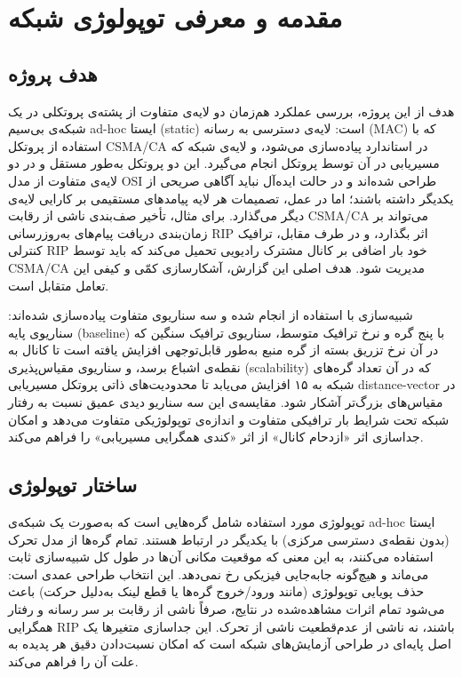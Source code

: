 \documentclass{article}
\begin{document}
	
	
	
	\newpage
	\tableofcontents
	\newpage
	
	\section{مقدمه و معرفی توپولوژی شبکه}
	
	\subsection{هدف پروژه}
	هدف از این پروژه، بررسی عملکرد هم‌زمان دو لایه‌ی متفاوت از پشته‌ی پروتکلی در یک شبکه‌ی بی‌سیم ad-hoc ایستا (static) است: لایه‌ی دسترسی به رسانه (MAC) که با استفاده از پروتکل CSMA/CA در استاندارد  پیاده‌سازی می‌شود، و لایه‌ی شبکه که مسیریابی در آن توسط پروتکل  انجام می‌گیرد. این دو پروتکل به‌طور مستقل و در دو لایه‌ی متفاوت از مدل OSI طراحی شده‌اند و در حالت ایده‌آل نباید آگاهی صریحی از یکدیگر داشته باشند؛ اما در عمل، تصمیمات هر لایه پیامدهای مستقیمی بر کارایی لایه‌ی دیگر می‌گذارد. برای مثال، تأخیر صف‌بندی ناشی از رقابت CSMA/CA می‌تواند بر زمان‌بندی دریافت پیام‌های به‌روزرسانی RIP اثر بگذارد، و در طرف مقابل، ترافیک کنترلی RIP خود بار اضافی بر کانال مشترک رادیویی تحمیل می‌کند که باید توسط CSMA/CA مدیریت شود. هدف اصلی این گزارش، آشکارسازی کمّی و کیفی این تعامل متقابل 
	 است.
	
	شبیه‌سازی با استفاده از  انجام شده و سه سناریوی متفاوت پیاده‌سازی شده‌اند: سناریوی پایه (baseline) با پنج گره و نرخ ترافیک متوسط، سناریوی ترافیک سنگین  که در آن نرخ تزریق بسته از گره منبع به‌طور قابل‌توجهی افزایش یافته است تا کانال به نقطه‌ی اشباع برسد، و سناریوی مقیاس‌پذیری (scalability) که در آن تعداد گره‌های شبکه به ۱۵ افزایش می‌یابد تا محدودیت‌های ذاتی پروتکل مسیریابی distance-vector در مقیاس‌های بزرگ‌تر آشکار شود. مقایسه‌ی این سه سناریو دیدی عمیق نسبت به رفتار شبکه تحت شرایط بار ترافیکی متفاوت و اندازه‌ی توپولوژیکی متفاوت می‌دهد و امکان جداسازی اثر «ازدحام کانال» از اثر «کندی همگرایی مسیریابی» را فراهم می‌کند.
	
	\subsection{ساختار توپولوژی}
	توپولوژی مورد استفاده شامل گره‌هایی است که به‌صورت یک شبکه‌ی ad-hoc ایستا (بدون نقطه‌ی دسترسی مرکزی) با یکدیگر در ارتباط هستند. تمام گره‌ها از مدل تحرک  استفاده می‌کنند، به این معنی که موقعیت مکانی آن‌ها در طول کل شبیه‌سازی ثابت می‌ماند و هیچ‌گونه جابه‌جایی فیزیکی رخ نمی‌دهد. این انتخاب طراحی عمدی است: حذف پویایی توپولوژی (مانند ورود/خروج گره‌ها یا قطع لینک به‌دلیل حرکت) باعث می‌شود تمام اثرات مشاهده‌شده در نتایج، صرفاً ناشی از رقابت بر سر رسانه
	و رفتار همگرایی RIP باشند، نه ناشی از عدم‌قطعیت ناشی از تحرک. این جداسازی متغیرها 
	یک اصل پایه‌ای در طراحی آزمایش‌های شبکه است که امکان نسبت‌دادن دقیق هر پدیده به علت آن را فراهم می‌کند.
	
\end{document}
